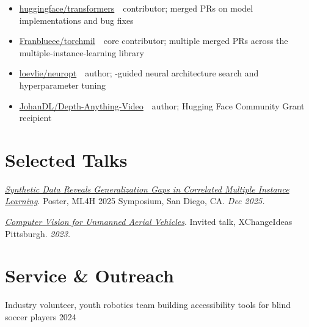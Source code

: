 \documentclass[10pt,letterpaper]{article}
\newcommand{\sansfam}{\sffamily}
\newcommand{\monofam}{\ttfamily}
\newcommand{\datestamp}[1]{{\sansfam\footnotesize\color{meta}\figureversion{lf}#1}}
\newcommand{\acro}[1]{\textls[80]{#1}}
\newenvironment{publist}{%
  \begin{list}{}{%
    \setlength{\leftmargin}{1.2em}%
    \setlength{\itemindent}{-1.2em}%
    \setlength{\itemsep}{2pt}%
    \setlength{\parsep}{0pt}%
    \setlength{\topsep}{1pt}%
  }%
}{\end{list}}
\begin{document}
\begin{itemize}
  \item \href{https://github.com/huggingface/transformers}{\monofam huggingface/transformers} \,\textemdash\, contributor; merged PRs on model implementations and bug fixes
  \item \href{https://github.com/Franblueee/torchmil}{\monofam Franblueee/torchmil} \,\textemdash\, core contributor; multiple merged PRs across the multiple-instance-learning library
  \item \href{https://github.com/loevlie/neuropt}{\monofam loevlie/neuropt} \,\textemdash\, author; \acro{LLM}-guided neural architecture search and hyperparameter tuning
  \item \href{https://huggingface.co/spaces/JohanDL/Depth-Anything-Video}{\monofam JohanDL/Depth-Anything-Video} \,\textemdash\, author; Hugging Face Community Grant recipient
\end{itemize}

\section{Selected Talks}

\begin{publist}
\item \href{https://drive.google.com/file/d/1Z6lkTsqYSIzOqgM53qONW2riQhVM5R0W/view?usp=sharing}{\textit{Synthetic Data Reveals Generalization Gaps in Correlated Multiple Instance Learning}}. Poster, ML4H 2025 Symposium, San Diego, CA. \textit{Dec 2025.}

\item \href{https://xchangepgh2023.sched.com/event/1LdC7/an-interactive-exploration-of-computer-vision-for-unmanned-aerial-vehicles-uavs}{\textit{Computer Vision for Unmanned Aerial Vehicles}}. Invited talk, XChangeIdeas Pittsburgh. \textit{2023.}
\end{publist}

\section{Service \& Outreach}

Industry volunteer, youth robotics team building accessibility tools for blind soccer players \hfill \datestamp{2024}
\end{document}
